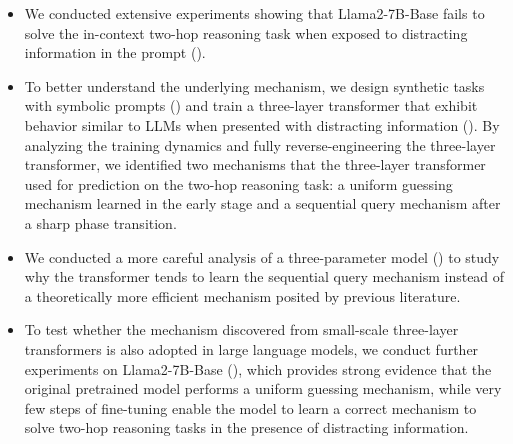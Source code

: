 \begin{itemize}
    \item We conducted extensive experiments showing that Llama2-7B-Base fails to solve the in-context two-hop reasoning task when exposed to distracting information in the prompt (). 
    \item To better understand the underlying mechanism, we design synthetic tasks with symbolic prompts () and train a three-layer transformer that exhibit behavior similar to LLMs when presented with distracting information  (). By analyzing the training dynamics and fully reverse-engineering the three-layer transformer, we identified two mechanisms that the three-layer transformer used for prediction on the two-hop reasoning task: a uniform guessing mechanism learned in the early stage and a sequential query mechanism after a sharp phase transition.  
    \item We conducted a more careful analysis of a three-parameter model () to study why the transformer tends to learn the sequential query mechanism instead of a theoretically more efficient mechanism posited by previous literature. 
    \item To test whether the mechanism discovered from small-scale three-layer transformers is also adopted in large language models, we conduct further experiments on Llama2-7B-Base (), which provides strong evidence that the original pretrained model performs a uniform guessing mechanism, while very few steps of fine-tuning enable the model to learn a correct mechanism to solve two-hop reasoning tasks in the presence of distracting information.  
\end{itemize}


